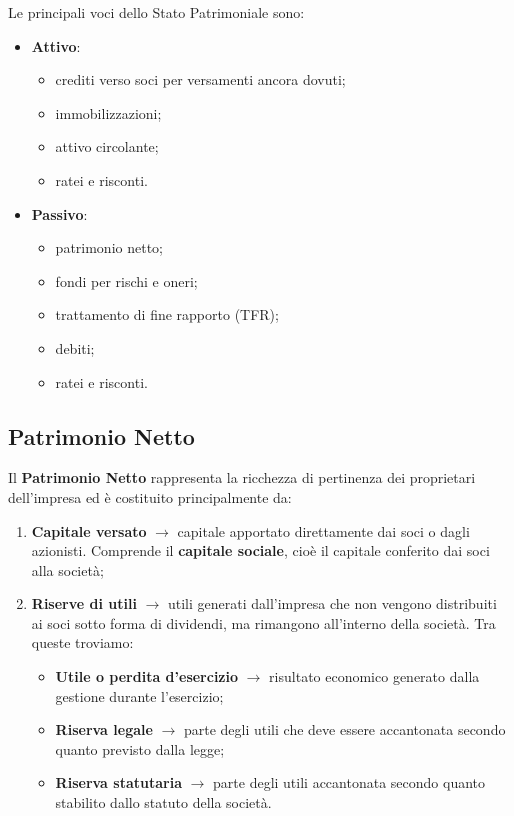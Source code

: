 \noindent Le principali voci dello Stato Patrimoniale sono:
\begin{itemize}
    \item \textbf{Attivo}:
    \begin{itemize}
        \item crediti verso soci per versamenti ancora dovuti;
        \item immobilizzazioni;
        \item attivo circolante;
        \item ratei e risconti.
    \end{itemize}
    \item \textbf{Passivo}:
    \begin{itemize}
        \item patrimonio netto;
        \item fondi per rischi e oneri;
        \item trattamento di fine rapporto (TFR);
        \item debiti;
        \item ratei e risconti.
    \end{itemize}
\end{itemize}

\subsection{Patrimonio Netto}
Il \textbf{Patrimonio Netto} rappresenta la ricchezza di pertinenza dei proprietari dell'impresa ed è costituito principalmente da:
\begin{enumerate}
    \item \textbf{Capitale versato} $\rightarrow$ capitale apportato direttamente dai soci o dagli azionisti. Comprende il 
    \textbf{capitale sociale}, cioè il capitale conferito dai soci alla società;
    \item \textbf{Riserve di utili} $\rightarrow$ utili generati dall'impresa che non vengono distribuiti ai soci sotto 
    forma di dividendi, ma rimangono all'interno della società. Tra queste troviamo:
    \begin{itemize}
        \item \textbf{Utile o perdita d'esercizio} $\rightarrow$ risultato economico generato dalla gestione durante l'esercizio;
        \item \textbf{Riserva legale} $\rightarrow$ parte degli utili che deve essere accantonata secondo quanto previsto dalla legge;
        \item \textbf{Riserva statutaria} $\rightarrow$ parte degli utili accantonata secondo quanto stabilito dallo statuto della società.
    \end{itemize}
\end{enumerate}

